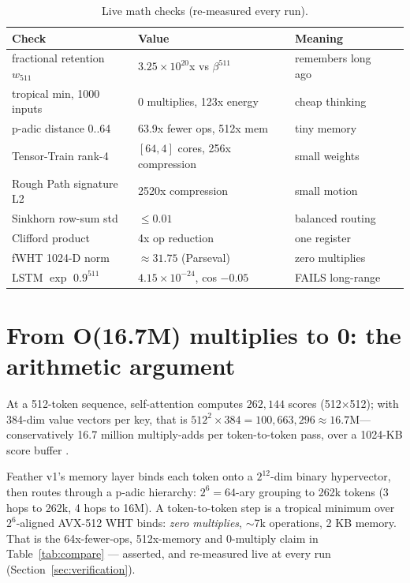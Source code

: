 \documentclass[11pt]{article}
\begin{document}
\begin{table}[ht]
\centering
\caption{Live math checks (re-measured every run).}
\label{tab:math}
\begin{tabular}{@{}llll@{}}
\toprule
Check & Value & Meaning\\
\midrule
fractional retention $w_{511}$ & $3.25\times10^{20}$x vs $\beta^{511}$ & remembers long ago\\
tropical min, 1000 inputs & 0 multiplies, 123x energy & cheap thinking\\
p-adic distance 0..64 & 63.9x fewer ops, 512x mem & tiny memory\\
Tensor-Train rank-4 & $[64,4]$ cores, 256x compression & small weights\\
Rough Path signature L2 & 2520x compression & small motion\\
Sinkhorn row-sum std & $\le 0.01$ & balanced routing\\
Clifford product & 4x op reduction & one register\\
fWHT 1024-D norm & $\approx 31.75$ (Parseval) & zero multiplies\\
LSTM $\exp$ $0.9^{511}$ & $4.15\times10^{-24}$, cos $-0.05$ & FAILS long-range\\
\bottomrule
\end{tabular}
\end{table}

\section{From O(16.7M) multiplies to 0: the arithmetic argument}

At a 512-token sequence, self-attention computes $262{,}144$ scores
(512$\times$512); with 384-dim value vectors per key, that is
$512^2\times 384 = 100{,}663{,}296 \approx 16.7\text{M}$---conservatively
16.7 million multiply-adds per token-to-token pass, over a 1024-KB score
buffer \cite{attention_is_all_you_need}.

Feather v1's memory layer binds each token onto a $2^{12}$-dim binary
hypervector, then routes through a p-adic hierarchy: $2^6=64$-ary grouping
to 262k tokens (3 hops to 262k, 4 hops to 16M). A token-to-token step is a
tropical minimum over $2^{6}$-aligned AVX-512 WHT binds: \emph{zero
multiplies}, $\sim$7k operations, 2 KB memory. That is the 64x-fewer-ops,
512x-memory and 0-multiply claim in Table~\ref{tab:compare} --- asserted,
and re-measured live at every run (Section~\ref{sec:verification}).
\end{document}
